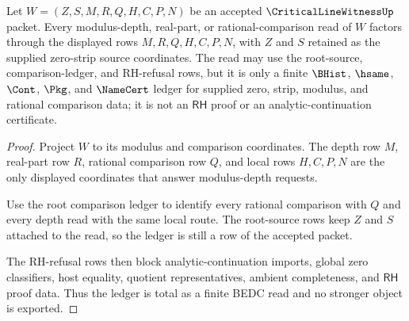 \begin{theorem}
\label{thm:critical-line-witness-modulus-depth-ledger}
Let $W=(Z,S,M,R,Q,H,C,P,N)$ be an accepted $\CriticalLineWitnessUp$ packet. Every modulus-depth, real-part, or rational-comparison read of $W$ factors through the displayed rows $M,R,Q,H,C,P,N$, with $Z$ and $S$ retained as the supplied zero-strip source coordinates. The read may use the root-source, comparison-ledger, and RH-refusal rows, but it is only a finite $\BHist$, $\hsame$, $\Cont$, $\Pkg$, and $\NameCert$ ledger for supplied zero, strip, modulus, and rational comparison data; it is not an $\mathsf{RH}$ proof or an analytic-continuation certificate.
\end{theorem}
\begin{proof}
Project $W$ to its modulus and comparison coordinates. The depth row $M$, real-part row $R$, rational comparison row $Q$, and local rows $H,C,P,N$ are the only displayed coordinates that answer modulus-depth requests.

Use the root comparison ledger to identify every rational comparison with $Q$ and every depth read with the same local route. The root-source rows keep $Z$ and $S$ attached to the read, so the ledger is still a row of the accepted packet.

The RH-refusal rows then block analytic-continuation imports, global zero classifiers, host equality, quotient representatives, ambient completeness, and $\mathsf{RH}$ proof data. Thus the ledger is total as a finite BEDC read and no stronger object is exported.
\end{proof}

